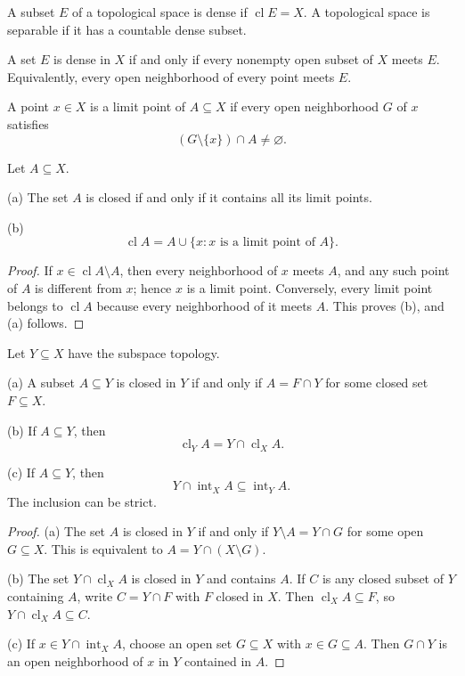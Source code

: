 \begin{de}
A subset $E$ of a topological space is dense if
$\operatorname{cl}E=X$. A topological space is separable if it has a
countable dense subset.
\end{de}

\begin{thm}
A set $E$ is dense in $X$ if and only if every nonempty open subset of $X$
meets $E$. Equivalently, every open neighborhood of every point meets $E$.
\end{thm}

\begin{de}
A point $x\in X$ is a limit point of $A\subseteq X$ if every open
neighborhood $G$ of $x$ satisfies
\[
(G\setminus\{x\})\cap A\neq\varnothing.
\]
\end{de}

\begin{thm}
Let $A\subseteq X$.

(a) The set $A$ is closed if and only if it contains all its limit points.

(b)
\[
\operatorname{cl}A=A\cup\{x:x\text{ is a limit point of }A\}.
\]
\end{thm}

\begin{proof}
If $x\in\operatorname{cl}A\setminus A$, then every neighborhood of $x$ meets
$A$, and any such point of $A$ is different from $x$; hence $x$ is a limit
point. Conversely, every limit point belongs to $\operatorname{cl}A$ because
every neighborhood of it meets $A$. This proves (b), and (a) follows.
\end{proof}

\begin{thm}
Let $Y\subseteq X$ have the subspace topology.

(a) A subset $A\subseteq Y$ is closed in $Y$ if and only if
$A=F\cap Y$ for some closed set $F\subseteq X$.

(b) If $A\subseteq Y$, then
\[
\operatorname{cl}_Y A=Y\cap\operatorname{cl}_X A.
\]

(c) If $A\subseteq Y$, then
\[
Y\cap\operatorname{int}_X A\subseteq\operatorname{int}_Y A.
\]
The inclusion can be strict.
\end{thm}

\begin{proof}
(a) The set $A$ is closed in $Y$ if and only if $Y\setminus A=Y\cap G$ for
some open $G\subseteq X$. This is equivalent to
$A=Y\cap(X\setminus G)$.

(b) The set $Y\cap\operatorname{cl}_X A$ is closed in $Y$ and contains $A$.
If $C$ is any closed subset of $Y$ containing $A$, write $C=Y\cap F$ with
$F$ closed in $X$. Then $\operatorname{cl}_X A\subseteq F$, so
$Y\cap\operatorname{cl}_X A\subseteq C$.

(c) If $x\in Y\cap\operatorname{int}_X A$, choose an open set
$G\subseteq X$ with $x\in G\subseteq A$. Then $G\cap Y$ is an open
neighborhood of $x$ in $Y$ contained in $A$.
\end{proof}

